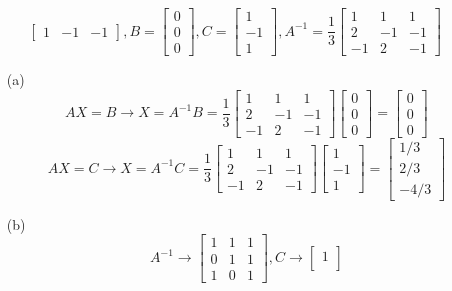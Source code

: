 \documentclass[12pt]{article}
\begin{document}
\begin{itemize}
$$\begin{bmatrix}
1 & -1 & -1
\end{bmatrix}, B = \begin{bmatrix}
0 \\
0 \\
0
\end{bmatrix}, C = \begin{bmatrix}
1 \\
-1 \\
1
\end{bmatrix}, A^{-1} = \frac{1}{3}\begin{bmatrix}
1 & 1 & 1 \\
2 & -1 & -1 \\
-1 & 2 & -1
\end{bmatrix} $$
\begin{itemize}
\item[(a)]
$$AX = B \rightarrow X = A^{-1}B = \frac{1}{3}\begin{bmatrix}
1 & 1 & 1 \\
2 & -1 & -1 \\
-1 & 2 & -1
\end{bmatrix}\begin{bmatrix}
0 \\
0 \\
0
\end{bmatrix} = \begin{bmatrix}
0 \\
0 \\
0
\end{bmatrix}$$
$$AX = C \rightarrow X = A^{-1}C = \frac{1}{3}\begin{bmatrix}
1 & 1 & 1 \\
2 & -1 & -1 \\
-1 & 2 & -1
\end{bmatrix}\begin{bmatrix}
1 \\
-1 \\
1
\end{bmatrix} = \begin{bmatrix}
1/3 \\
2/3 \\
-4/3
\end{bmatrix}$$
\item[(b)]
$$A^{-1} \rightarrow \begin{bmatrix}
1 & 1 & 1 \\
0 & 1 & 1 \\
1 & 0 & 1
\end{bmatrix}, C \rightarrow \begin{bmatrix}
1 \\

\end{bmatrix}$$
\end{itemize}
\end{itemize}
\end{document}
